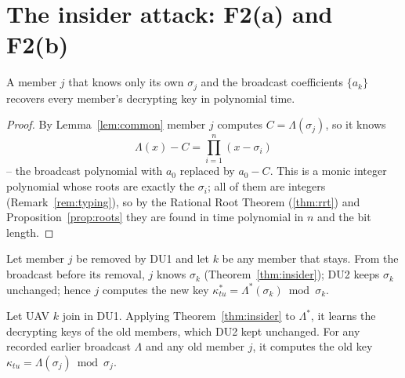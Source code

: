 \section{The insider attack: F2(a) and F2(b)}
\begin{theorem}\label{thm:insider}
A member $j$ that knows only its own $\sigma_j$ and the broadcast coefficients $\{a_k\}$ recovers every member's decrypting key in polynomial time.
\end{theorem}
\begin{proof}
By Lemma~\ref{lem:common} member $j$ computes $C=\Lambda(\sigma_j)$, so it knows
\[
\boxed{\;\Lambda(x)-C=\prod_{i=1}^{n}(x-\sigma_i)\;}
\]
-- the broadcast polynomial with $a_0$ replaced by $a_0-C$. This is a monic integer polynomial whose roots are exactly the $\sigma_i$; all of them are
integers (Remark~\ref{rem:typing}), so by the Rational Root Theorem (\ref{thm:rrt}) and Proposition~\ref{prop:roots} they are found in time polynomial in
$n$ and the bit length.
\end{proof}

\begin{corollary}\label{cor:revoke}
Let member $j$ be removed by DU1 and let $k$ be any member that stays. From the broadcast before its removal, $j$ knows $\sigma_k$
(Theorem~\ref{thm:insider}); DU2 keeps $\sigma_k$ unchanged; hence $j$ computes the new key $\kappa^*_{tu}=\Lambda^*(\sigma_k)\bmod\sigma_k$.
\end{corollary}

\begin{corollary}\label{cor:backward}
Let UAV $k$ join in DU1. Applying Theorem~\ref{thm:insider} to $\Lambda^*$, it learns the decrypting keys of the old members, which DU2 kept unchanged. For
any recorded earlier broadcast $\Lambda$ and any old member $j$, it computes the old key $\kappa_{tu}=\Lambda(\sigma_j)\bmod\sigma_j$.
\end{corollary}

